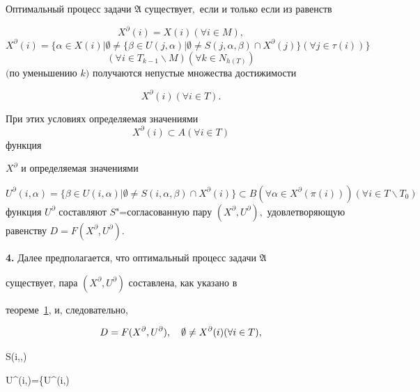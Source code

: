 \smallskip



\hypertarget{ovch:th1}{}



\begin{theorem}[1]Оптимальный процесс задачи \hyperlink{ovch:zadmm}{$\mathfrak{A}$} существует$,$ если и только если из равенств

$$X^\partial (i)=X(i)(\forall i\in M),$$ $$

X^\partial (i)=\{\alpha \in X(i)\vert \emptyset \ne \{\beta \in

U(j,\alpha)\vert \emptyset \ne S(j,\alpha ,\beta)\cap

X^\partial (j)\}(\forall j\in \tau (i))\}$$ $$

(\forall i\in T_{k-1} \backslash M) (\forall k\in N_{h(T)})$$ $($по уменьшению $k)$ получаются непустые множества достижимости 

$$X^\partial (i)(\forall i\in T).$$ 

При этих условиях определяемая значениями $$X^\partial (i)\subset A (\forall i\in T)$$ функция

$X^\partial $ и определяемая значениями 

$$U^\partial (i,\alpha )=\{\beta \in U(i,\alpha )\vert \emptyset

\ne S(i,\alpha ,\beta )\cap X^\partial (i)\}\subset B(\forall \alpha \in

X^\partial (\pi (i)))(\forall i\in T\backslash T_0 )$$ функция $U^\partial$ составляют $S$"=согласованную пару $(X^\partial ,U^\partial ),$ удовлетворяющую равенству $D=F(X^\partial ,U^\partial).$

\end{theorem}



\smallskip



{\bf 4.} Далее предполагается, что оптимальный процесс задачи \hyperlink{ovch:zadmm}{$\mathfrak{A}$}

существует, пара $(X^\partial,U^\partial )$ составлена, как указано в

теореме~\hyperlink{ovch:th1}{1}, и, следовательно, 

$$

D=F(X^\partial,U^\partial),\quad 

\emptyset \ne X^\partial (i)(\forall i\in T\mbox),$$ 

$$S(i,\alpha ,\beta)\ne

\emptyset \ne U^\partial (i,\alpha )=\{\beta \in U^\partial (i,\alpha )\vert

